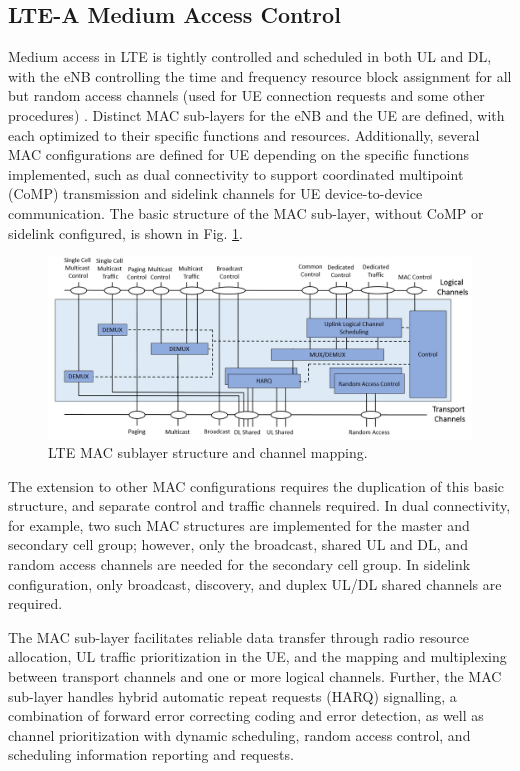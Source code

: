 \subsection{\mbox{LTE-A} Medium Access Control}
\label{lte-mac}
Medium access in LTE is tightly controlled and scheduled in both UL and DL, with the eNB controlling the time and frequency resource block assignment for all but random access channels (used for UE connection requests and some other procedures) \cite{tr36321}.  Distinct MAC sub-layers for the eNB and the UE are defined, with each optimized to their specific functions and resources.  Additionally, several MAC configurations are defined for UE depending on the specific functions implemented, such as dual connectivity to support coordinated multipoint (CoMP) transmission and sidelink channels for UE device-to-device communication. The basic structure of the MAC sub-layer, without CoMP or sidelink configured, is shown in Fig. \ref{figs:lte-mac}.
\begin{figure}[!ht]
	\centering
	\includegraphics[width=\textwidth]{figs/LTE-MAC}	
	\caption{LTE MAC sublayer structure and channel mapping.}
	\label{figs:lte-mac}
\end{figure}
The extension to other MAC configurations requires the duplication of this basic structure, and separate control and traffic channels required. In dual connectivity, for example, two such MAC structures are implemented for the master and secondary cell group; however, only the broadcast, shared UL and DL, and random access channels are needed for the secondary cell group.  In sidelink configuration, only broadcast, discovery, and duplex UL/DL shared channels are required.

The MAC sub-layer facilitates reliable data transfer through radio resource allocation, UL traffic prioritization in the UE, and the mapping and multiplexing between transport channels and one or more logical channels. Further, the MAC sub-layer handles hybrid automatic repeat requests (HARQ) signalling, a combination of forward error correcting coding and error detection, as well as channel prioritization with dynamic scheduling, random access control, and scheduling information reporting and requests.

